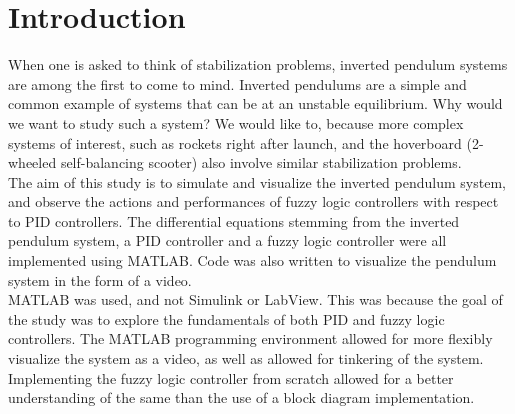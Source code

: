 \section{Introduction}

When one is asked to think of stabilization problems, inverted pendulum systems are among the first to come to mind. Inverted pendulums are a simple and common example of systems that can be at an unstable equilibrium. Why would we want to study such a system? We would like to, because more complex systems of interest, such as rockets right after launch, and the hoverboard (2-wheeled self-balancing scooter) also involve similar stabilization problems. \\

The aim of this study is to simulate and visualize the inverted pendulum system, and observe the actions and performances of fuzzy logic controllers with respect to PID controllers. The differential equations stemming from the inverted pendulum system, a PID controller and a fuzzy logic controller were all implemented using MATLAB. Code was also written to visualize the pendulum system in the form of a video. \\

MATLAB was used, and not Simulink or LabView. This was because the goal of the study was to explore the fundamentals of both PID and fuzzy logic controllers. The MATLAB programming environment allowed for more flexibly visualize the system as a video, as well as allowed for tinkering of the system. Implementing the fuzzy logic controller from scratch allowed for a better understanding of the same than the use of a block diagram implementation.